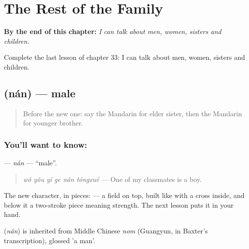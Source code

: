 
\chapter{The Rest of the Family}
\label{ch:zh-the-rest-of-the-family}

\begin{chapteropening}
\textbf{By the end of this chapter:} \emph{I can talk about men, women, sisters and children.}

Complete the last lesson of chapter 33: I can talk about men, women, sisters and children.
\end{chapteropening}

\section[\texorpdfstring{\zh{男} (nán)}{男 (nán)}]{ (nán) — male}

\label{lesson:ZH-C33-nan}



\begin{quote}
Before the new one: say the Mandarin for elder sister, then the Mandarin for younger brother.
\end{quote}

\subsection*{You'll want to know: }
\textbf{} — \emph{nán} — \textquotedblleft{}male\textquotedblright{}.

\begin{quote}
\textbf{} \emph{wǒ yǒu yí ge nán tóngxué} — One of my classmates is a boy.
\end{quote}

The new character, in pieces:  — a field on top, built like  with a cross inside, and below it a two-stroke piece meaning strength. The next lesson puts it in your hand.

\begin{cousinweb}
\textbf{} (\emph{nán}) is inherited from Middle Chinese \emph{nom} (Guangyun, in Baxter's transcription), glossed 'a man'.
\end{cousinweb}

